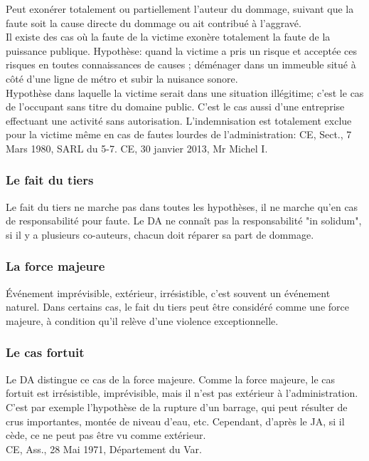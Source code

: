 \documentclass[10pt, a4paper, openany]{book}
\begin{document}
Peut exonérer totalement ou partiellement l'auteur du dommage, suivant que la faute soit la cause directe du dommage ou ait contribué à l'aggravé. \\
Il existe des cas où la faute de la victime exonère totalement la faute de la puissance publique. Hypothèse: quand la victime a pris un risque et acceptée ces risques en toutes connaissances de causes ; déménager dans un immeuble situé à côté d'une ligne de métro et subir la nuisance sonore. \\
Hypothèse dans laquelle la victime serait dans une situation illégitime; c'est le cas de l'occupant sans titre du domaine public. C'est le cas aussi d'une entreprise effectuant une activité sans autorisation. L'indemnisation est totalement exclue pour la victime même en cas de fautes lourdes de l'administration: CE, Sect., 7 Mars 1980, SARL du 5-7. CE, 30 janvier 2013, Mr Michel I.  

\subsubsection{Le fait du tiers}

Le fait du tiers ne marche pas dans toutes les hypothèses, il ne marche qu'en cas de responsabilité pour faute. Le DA ne connaît pas la responsabilité "in solidum", si il y a plusieurs co-auteurs, chacun doit réparer sa part de dommage. 


\subsubsection{La force majeure}

Événement imprévisible, extérieur, irrésistible, c'est souvent un événement naturel. Dans certains cas, le fait du tiers peut être considéré comme une force majeure, à condition qu'il relève d'une violence exceptionnelle. 

\subsubsection{Le cas fortuit}

Le DA distingue ce cas de la force majeure. Comme la force majeure, le cas fortuit est irrésistible, imprévisible, mais il n'est pas extérieur à l'administration. C'est par exemple l'hypothèse de la rupture d'un barrage, qui peut résulter de crus importantes, montée de niveau d'eau, etc. Cependant, d'après le JA, si il cède, ce ne peut pas être vu comme extérieur. \\
CE, Ass., 28 Mai 1971, Département du Var.  
\end{document}
